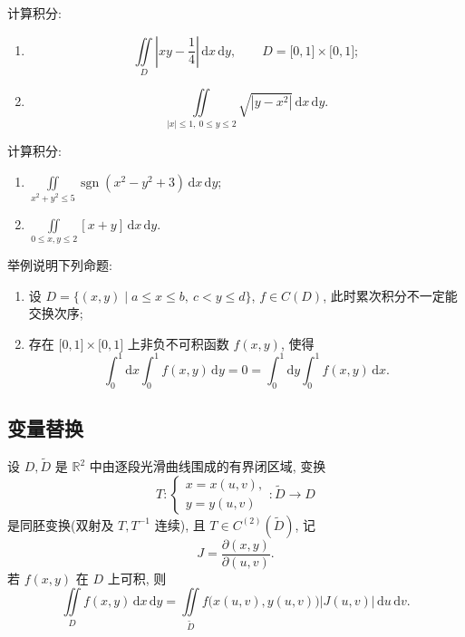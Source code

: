 \documentclass[../数学分析培优讲义.tex]{subfiles}
\begin{document}
\begin{example}
计算积分:
\begin{enumerate}[label=(\arabic*)]
    \item
    \[
        \iint\limits_D\left|xy-\dfrac{1}{4}\right|\,\mathrm{d}x\,\mathrm{d}y,
        \qquad D=\lbrack0,1\rbrack\times\lbrack0,1\rbrack;
    \]
    \item
    \[
        \iint\limits_{|x|\leq1,\ 0\leq y\leq2}\sqrt{|y-x^2|}\,\mathrm{d}x\,\mathrm{d}y.
    \]
\end{enumerate}
\end{example}
\exampleblank

\begin{example}
计算积分:
\begin{enumerate}[label=(\arabic*)]
    \item $\displaystyle\iint\limits_{x^2+y^2\leq5}\operatorname{sgn}(x^2-y^2+3)\,\mathrm{d}x\,\mathrm{d}y$;
    \item $\displaystyle\iint\limits_{0\leq x,y\leq2}[x+y]\,\mathrm{d}x\,\mathrm{d}y$.
\end{enumerate}
\end{example}
\exampleblank

\begin{example}
举例说明下列命题:
\begin{enumerate}[label=(\arabic*)]
    \item 设 $D=\{(x,y)\mid a\leq x\leq b,\ c<y\leq d\}$, $f\in C(D)$, 此时累次积分不一定能交换次序;
    \item 存在 $\lbrack0,1\rbrack\times\lbrack0,1\rbrack$ 上非负不可积函数 $f(x,y)$, 使得
    \[
        \int_0^1\mathrm{d}x\int_0^1f(x,y)\,\mathrm{d}y
        =0
        =\int_0^1\mathrm{d}y\int_0^1f(x,y)\,\mathrm{d}x.
    \]
\end{enumerate}
\end{example}
\exampleblank


\newpage

\subsection{变量替换}

\begin{theorem}[\markstar]
设 $D,\widetilde D$ 是 $\mathbb{R}^2$ 中由逐段光滑曲线围成的有界闭区域, 变换
\[
    T:\begin{cases}
        x=x(u,v),\\
        y=y(u,v)
    \end{cases}
    :\widetilde D\to D
\]
是同胚变换(双射及 $T,T^{-1}$ 连续), 且 $T\in C^{(2)}(\widetilde D)$, 记
\[
    J=\dfrac{\partial(x,y)}{\partial(u,v)}.
\]
若 $f(x,y)$ 在 $D$ 上可积, 则
\[
    \iint\limits_Df(x,y)\,\mathrm{d}x\,\mathrm{d}y
    =\iint\limits_{\widetilde D}f\bigl(x(u,v),y(u,v)\bigr)|J(u,v)|\,\mathrm{d}u\,\mathrm{d}v.
\]
\end{theorem}
\end{document}
